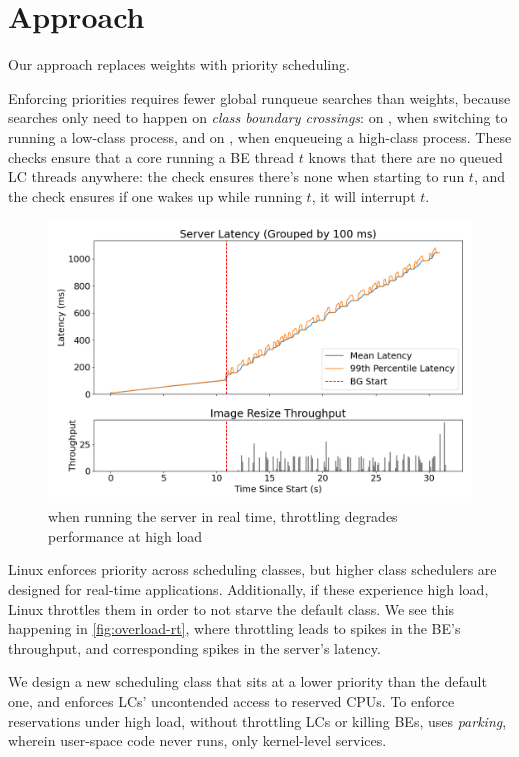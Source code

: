 \section{Approach}

Our approach replaces weights with priority scheduling.

Enforcing priorities requires fewer global runqueue searches than weights,
because searches only need to happen on \textit{class boundary crossings}: on
\exit{}, when switching to running a low-class process, and on \entry{}, when
enqueueing a high-class process. These checks ensure that a core running a BE
thread $t$ knows that there are no queued LC threads anywhere: the \exit{} check
ensures there's none when starting to run $t$, and the \entry{} check ensures if
one wakes up while running $t$, it will interrupt $t$.

\begin{figure}[t]
    \centering
    \includegraphics[width=\columnwidth]{graphs/overload-rt.png}
    \caption{when running the server in real time, throttling degrades
    performance at high load}\label{fig:overload-rt}
\end{figure}


Linux enforces priority across scheduling classes, but higher class schedulers
are designed for real-time applications. Additionally, if these experience high
load, Linux throttles them in order to not starve the default class. We see this
happening in \autoref{fig:overload-rt}, where throttling leads to spikes in the
BE's throughput, and corresponding spikes in the server's latency.

We design a new scheduling class \beclass{} that sits at a lower priority than
the default one, and enforces LCs' uncontended access to reserved CPUs. To
enforce reservations under high load, without throttling LCs or killing BEs,
\beclass{} uses \textit{parking}, wherein user-space code never runs, only
kernel-level services.
